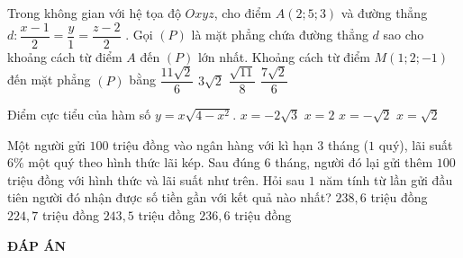 \begin{ex}%
	Trong không gian với hệ tọa độ $Oxyz$, cho điểm $A(2;5;3)$  và đường thẳng $d\colon \dfrac{x-1}{2}=\dfrac{y}{1}=\dfrac{z-2}{2}$ . Gọi $(P)$  là mặt phẳng chứa đường thẳng $d$  sao cho khoảng cách từ điểm  $A$ đến $(P)$  lớn nhất. Khoảng cách từ điểm $M(1;2;-1)$  đến mặt phẳng $(P)$  bằng
	\choice
	{\True $\dfrac{11\sqrt{2}}{6}$}
	{$3\sqrt{2}$}
	{$\dfrac{\sqrt{11}}{8}$}
	{$\dfrac{7\sqrt{2}}{6}$}
\end{ex}
\begin{ex}%
	Điểm cực tiểu của hàm số $y=x\sqrt{4-x^2}$.
	\choice
	{$x=-2\sqrt{3}$}
	{$x=2$}
	{\True  $x=-\sqrt{2}$}
	{$x=\sqrt{2}$}
\end{ex}
\begin{ex}%
	Một người gửi $100$  triệu đồng vào ngân hàng với kì hạn $3$  tháng ($1$ quý), lãi suất $6\%$  một quý theo hình thức lãi kép. Sau đúng  $6$ tháng, người đó lại gửi thêm $100$  triệu đồng với hình thức và lãi suất như trên. Hỏi sau $1$  năm tính từ lần gửi đầu tiên người đó nhận được số tiền gần với kết quả nào nhất?
	\choice
	{\True $238{,}6$ triệu đồng}
	{$224{,}7$ triệu đồng}
	{$243{,}5$ triệu đồng}
	{$236{,}6$ triệu đồng}
\end{ex}
\newpage
\begin{center}
	\textbf{ĐÁP ÁN}
\end{center}
\begin{multicols}{10}
	 
\end{multicols}


